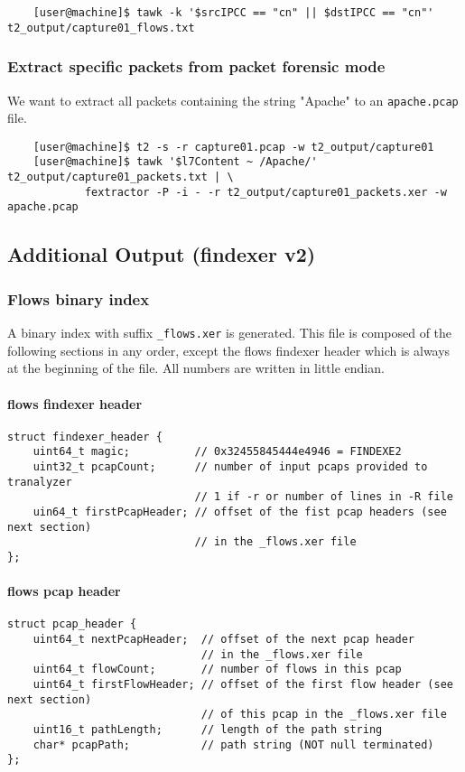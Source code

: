 \documentclass[documentation]{subfiles}
\begin{document}
{\small
    \begin{verbatim}
    [user@machine]$ tawk -k '$srcIPCC == "cn" || $dstIPCC == "cn"' t2_output/capture01_flows.txt
    \end{verbatim}
}

\subsubsection{Extract specific packets from packet forensic mode}

We want to extract all packets containing the string "Apache" to an {\tt apache.pcap} file.

{\small
    \begin{verbatim}
    [user@machine]$ t2 -s -r capture01.pcap -w t2_output/capture01
    [user@machine]$ tawk '$l7Content ~ /Apache/' t2_output/capture01_packets.txt | \
            fextractor -P -i - -r t2_output/capture01_packets.xer -w apache.pcap
    \end{verbatim}
}


\subsection{Additional Output (findexer v2)}

\subsubsection{Flows binary index}

A binary index with suffix {\tt \_flows.xer} is generated. This file is composed of the following
sections in any order, except the flows findexer header which is always at the beginning of the file.
All numbers are written in little endian.

\paragraph{flows findexer header}
\begin{verbatim}
struct findexer_header {
    uint64_t magic;          // 0x32455845444e4946 = FINDEXE2
    uint32_t pcapCount;      // number of input pcaps provided to tranalyzer
                             // 1 if -r or number of lines in -R file
    uin64_t firstPcapHeader; // offset of the fist pcap headers (see next section)
                             // in the _flows.xer file
};
\end{verbatim}

\paragraph{flows pcap header}
\begin{verbatim}
struct pcap_header {
    uint64_t nextPcapHeader;  // offset of the next pcap header
                              // in the _flows.xer file
    uint64_t flowCount;       // number of flows in this pcap
    uint64_t firstFlowHeader; // offset of the first flow header (see next section)
                              // of this pcap in the _flows.xer file
    uint16_t pathLength;      // length of the path string
    char* pcapPath;           // path string (NOT null terminated)
};
\end{verbatim}
\end{document}

